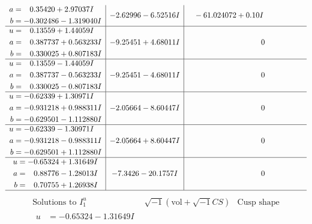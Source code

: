 \documentclass[1p]{elsarticle_modified}
\theoremstyle{definition}
\newcommand{\I}{\sqrt{-1}}
\begin{document}
$$\begin{array}{c|c|c}
\begin{aligned}
a &= \phantom{-}0.35420 + 2.97037 I \\
b &= -0.302486 - 1.319040 I\end{aligned}
 & -2.62996 - 6.52516 I & \phantom{-}                -6
1.024072 + 0. 10   I\phantom{ +0.000000I} \\ \hline\begin{aligned}
u &= \phantom{-}0.13559 + 1.44059 I \\
a &= \phantom{-}0.387737 + 0.563233 I \\
b &= \phantom{-}0.330025 + 0.807183 I\end{aligned}
 & -9.25451 + 4.68011 I & \phantom{-0.000000 } 0 \\ \hline\begin{aligned}
u &= \phantom{-}0.13559 - 1.44059 I \\
a &= \phantom{-}0.387737 - 0.563233 I \\
b &= \phantom{-}0.330025 - 0.807183 I\end{aligned}
 & -9.25451 - 4.68011 I & \phantom{-0.000000 } 0 \\ \hline\begin{aligned}
u &= -0.62339 + 1.30971 I \\
a &= -0.931218 + 0.988311 I \\
b &= -0.629501 - 1.112880 I\end{aligned}
 & -2.05664 - 8.60447 I & \phantom{-0.000000 } 0 \\ \hline\begin{aligned}
u &= -0.62339 - 1.30971 I \\
a &= -0.931218 - 0.988311 I \\
b &= -0.629501 + 1.112880 I\end{aligned}
 & -2.05664 + 8.60447 I & \phantom{-0.000000 } 0 \\ \hline\begin{aligned}
u &= -0.65324 + 1.31649 I \\
a &= \phantom{-}0.88776 - 1.28013 I \\
b &= \phantom{-}0.70755 + 1.26938 I\end{aligned}
 & -7.3426 - 20.1757 I & \phantom{-0.000000 } 0\\
 \hline 
 \end{array}$$\newpage$$\begin{array}{c|c|c}  
\text{Solutions to }I^u_{1}& \I (\text{vol} + \sqrt{-1}CS) & \text{Cusp shape}\\
 \hline 
\begin{aligned}
u &= -0.65324 - 1.31649 I \\

\end{aligned}
\end{array}$$
\end{document}
